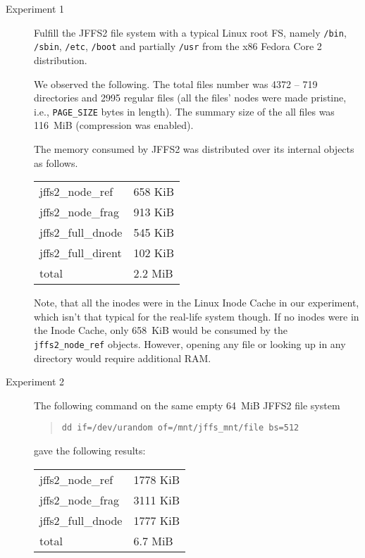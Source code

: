 \documentclass[12pt,a4paper,oneside,titlepage]{article}
\begin{document}
\begin{description}
\item[Experiment 1]
Fulfill the JFFS2 file system with a typical Linux root FS, namely
\texttt{/bin}, \texttt{/sbin}, \texttt{/etc}, \texttt{/boot} and
partially \texttt{/usr} from the x86 Fedora Core 2 distribution.

We observed the following.
The total files number was 4372 -- 719 directories and 2995 regular
files (all the files' nodes were made pristine, i.e.,
\texttt{PAGE\_SIZE} bytes in length).
The summary size of the all files was 116~MiB (compression was enabled).

The memory consumed by JFFS2 was distributed over its internal objects
as follows.

\begin{center}
\begin{tabular}{ll}
jffs2\_node\_ref    & 658 KiB \\
jffs2\_node\_frag   & 913 KiB \\
jffs2\_full\_dnode  & 545 KiB \\
jffs2\_full\_dirent & 102 KiB \\
\hline
total               & 2.2 MiB
\end{tabular}
\end{center}

Note, that all the inodes were in the Linux Inode Cache in our experiment,
which isn't that typical
for the real-life system though. If no inodes were in the Inode Cache,
only 658~KiB would be consumed by the \texttt{jffs2\_node\_ref}
objects. However, opening any
file or looking up in any directory would require additional RAM.

\item[Experiment 2]
The following command on the same empty 64~MiB JFFS2 file
system
\begin{quote}
\texttt{dd if=/dev/urandom of=/mnt/jffs\_mnt/file bs=512}
\end{quote}
gave the following results:

\begin{center}
\begin{tabular}{ll}
jffs2\_node\_ref    & 1778 KiB \\
jffs2\_node\_frag   & 3111 KiB \\
jffs2\_full\_dnode  & 1777 KiB \\
\hline
total               & 6.7 MiB
\end{tabular}
\end{center}


\end{description}
\end{document}
